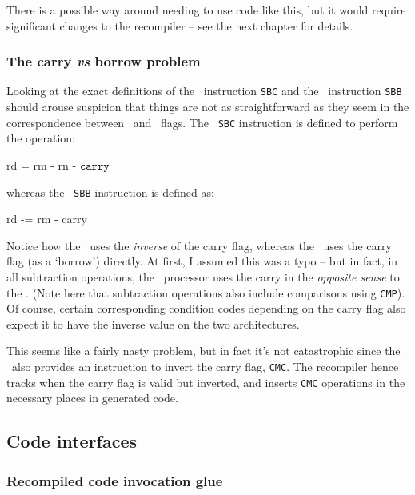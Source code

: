 There is a possible way around needing to use code like this, but it would require significant changes to the recompiler -- see the next chapter for details.

\subsubsection{The carry {\it vs} borrow problem}

Looking at the exact definitions of the \arm\ instruction {\tt SBC} and the \ia\ instruction {\tt SBB} should arouse suspicion that things are not as straightforward as they seem in the correspondence between \ia\ and \arm\ flags. The \arm\ {\tt SBC} instruction is defined to perform the operation:

\begin{code}
rd = rm - rn - $\overline{\mathtt{carry}}$
\end{code}

whereas the \ia\ {\tt SBB} instruction is defined as:

\begin{code}
rd -= rm - carry
\end{code}

Notice how the \arm\ uses the {\em inverse} of the carry flag, whereas the \ia\ uses the carry flag (as a `borrow') directly. At first, I assumed this was a typo -- but in fact, in all subtraction operations, the \ia\ processor uses the carry in the {\it opposite sense} to the \arm. (Note here that subtraction operations also include comparisons using {\tt CMP}). Of course, certain corresponding condition codes depending on the carry flag also expect it to have the inverse value on the two architectures.

This seems like a fairly nasty problem, but in fact it's not catastrophic since the \ia\ also provides an instruction to invert the carry flag, {\tt CMC}. The recompiler hence tracks when the carry flag is valid but inverted, and inserts {\tt CMC} operations in the necessary places in generated code.

\subsection{Code interfaces}

\subsubsection{Recompiled code invocation glue}

